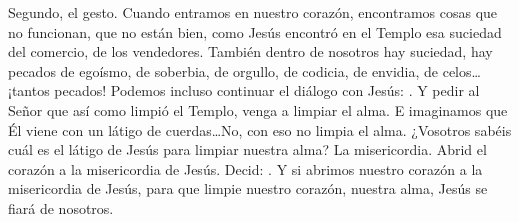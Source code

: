 \begin{body}
Segundo, el gesto. Cuando entramos en nuestro corazón, encontramos cosas que no funcionan, que no están bien, como Jesús encontró en el Templo esa suciedad del comercio, de los vendedores. También dentro de nosotros hay suciedad, hay pecados de egoísmo, de soberbia, de orgullo, de codicia, de envidia, de celos\ldots ¡tantos pecados! Podemos incluso continuar el diálogo con Jesús: . Y pedir al Señor que así como limpió el Templo, venga a limpiar el alma. E imaginamos que Él viene con un látigo de cuerdas\ldots No, con eso no limpia el alma. ¿Vosotros sabéis cuál es el látigo de Jesús para limpiar nuestra alma? La misericordia. Abrid el corazón a la misericordia de Jesús. Decid: . Y si abrimos nuestro corazón a la misericordia de Jesús, para que limpie nuestro corazón, nuestra alma, Jesús se fiará de nosotros.
\end{body}

